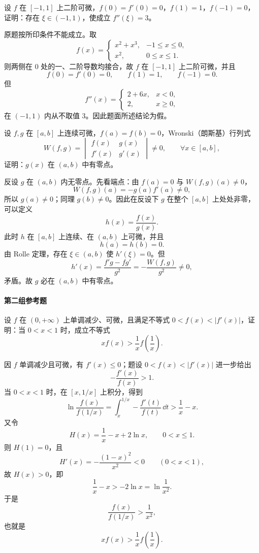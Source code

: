 \begin{xreferenceproblem}[17]
设 $f$ 在 $[-1,1]$ 上二阶可微，$f(0)=f'(0)=0$，$f(1)=1$，$f(-1)=0$，证明：存在 $\xi\in(-1,1)$，使成立 $f''(\xi)=3$。
\end{xreferenceproblem}
\begin{xsolution}
原题按所印条件不能成立。取
\[
  f(x)=
  \begin{cases}
    x^2+x^3,&-1\le x\le0,\\
    x^2,&0\le x\le1.
  \end{cases}
\]
则两侧在 $0$ 处的一、二阶导数均接合，故 $f$ 在 $[-1,1]$ 上二阶可微，并且
\[
  f(0)=f'(0)=0,\qquad f(1)=1,\qquad f(-1)=0.
\]
但
\[
  f''(x)=
  \begin{cases}
    2+6x,&x<0,\\
    2,&x\ge0,
  \end{cases}
\]
在 $(-1,1)$ 内从不取值 3。因此题面所述结论为假。
\end{xsolution}


\begin{xreferenceproblem}[18]
设 $f,g$ 在 $[a,b]$ 上连续可微，$f(a)=f(b)=0$，Wronski（朗斯基）行列式
  \[
    W(f,g)=
    \begin{vmatrix}
      f(x)&g(x)\\
      f'(x)&g'(x)
    \end{vmatrix}
    \ne0,\qquad\forall x\in[a,b],
  \]
  证明：$g(x)$ 在 $(a,b)$ 中有零点。
\end{xreferenceproblem}
\begin{xsolution}
反设 $g$ 在 $(a,b)$ 内无零点。先看端点：由 $f(a)=0$ 与 $W(f,g)(a)\ne0$，
\[
  W(f,g)(a)=-g(a)f'(a)\ne0,
\]
所以 $g(a)\ne0$；同理 $g(b)\ne0$。因此在反设下 $g$ 在整个 $[a,b]$ 上处处非零，可以定义
\[
  h(x)=\frac{f(x)}{g(x)}.
\]
此时 $h$ 在 $[a,b]$ 上连续、在 $(a,b)$ 上可微，并且
\[
  h(a)=h(b)=0.
\]
由 Rolle 定理，存在 $\xi\in(a,b)$ 使 $h'(\xi)=0$。但
\[
  h'(x)=\frac{f'g-fg'}{g^2}
  =-\frac{W(f,g)}{g^2}\ne0,
\]
矛盾。故 $g$ 必在 $(a,b)$ 中有零点。
\end{xsolution}


\paragraph{第二组参考题}

\begin{xreferenceproblem}[1]
设 $f$ 在 $(0,+\infty)$ 上单调减少、可微，且满足不等式 $0<f(x)<|f'(x)|$，证明：当 $0<x<1$ 时，成立不等式
  \[
    xf(x)>\frac1x f\left(\frac1x\right).
  \]
\end{xreferenceproblem}
\begin{xsolution}
因 $f$ 单调减少且可微，有 $f'(x)\le0$；题设 $0<f(x)<|f'(x)|$ 进一步给出
\[
  -\frac{f'(x)}{f(x)}>1.
\]
当 $0<x<1$ 时，在 $[x,1/x]$ 上积分，得到
\[
  \ln\frac{f(x)}{f(1/x)}
  =\int_x^{1/x}-\frac{f'(t)}{f(t)}\,\dd t
  >\frac1x-x.
\]
又令
\[
  H(x)=\frac1x-x+2\ln x,
  \qquad 0<x\le1.
\]
则 $H(1)=0$，且
\[
  H'(x)=-\frac{(1-x)^2}{x^2}<0\qquad(0<x<1),
\]
故 $H(x)>0$，即
\[
  \frac1x-x>-2\ln x=\ln\frac1{x^2}.
\]
于是
\[
  \frac{f(x)}{f(1/x)}>\frac1{x^2},
\]
也就是
\[
  \boxed{x f(x)>\frac1x f\left(\frac1x\right)}.
\]
\end{xsolution}


